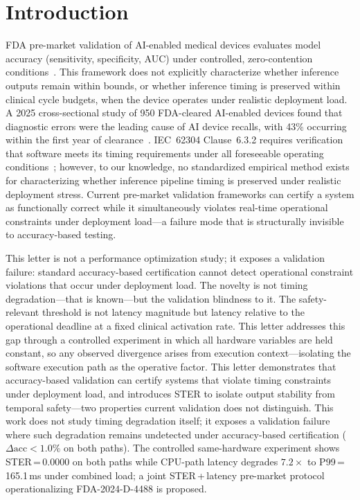 \documentclass[journal,10pt,twocolumn]{IEEEtran}
\begin{document}
\section{Introduction}

FDA pre-market validation of AI-enabled medical devices evaluates model
accuracy (sensitivity, specificity, AUC) under controlled,
zero-contention conditions~\cite{fda_draft_guidance}.
This framework does not explicitly characterize whether inference outputs
remain within bounds, or whether inference timing is preserved within
clinical cycle budgets, when the device operates under realistic
deployment load.
A 2025 cross-sectional study of 950 FDA-cleared AI-enabled devices found
that diagnostic errors were the leading cause of AI device recalls, with
43\% occurring within the first year of clearance~\cite{lee2025recalls}.
IEC~62304 Clause~6.3.2 requires verification that software meets its
timing requirements under all foreseeable operating conditions~\cite{iec62304};
however, to our knowledge, no standardized empirical method exists for characterizing
whether inference pipeline timing is preserved under realistic deployment
stress.
Current pre-market validation frameworks can certify a system as
functionally correct while it simultaneously violates real-time
operational constraints under deployment load---a failure mode that is
structurally invisible to accuracy-based testing.

This letter is not a performance optimization study; it exposes a
validation failure: standard accuracy-based certification cannot detect
operational constraint violations that occur under deployment load.
The novelty is not timing degradation---that is known---but the
validation blindness to it.
The safety-relevant threshold is not latency magnitude but latency
relative to the operational deadline at a fixed clinical activation rate.
This letter addresses this gap through a controlled experiment in which
all hardware variables are held constant, so any observed divergence
arises from execution context---isolating the software execution path
as the operative factor.
This letter demonstrates that accuracy-based validation can certify
systems that violate timing constraints under deployment load, and
introduces STER to isolate output stability from temporal safety---two
properties current validation does not distinguish.
This work does not study timing degradation itself; it exposes a
validation failure where such degradation remains undetected under
accuracy-based certification ($\Delta\mathrm{acc}{<}1.0\%$ on both paths).
The controlled same-hardware experiment shows STER\,=\,0.0000 on both
paths while CPU-path latency degrades $7.2{\times}$ to
P99\,=\,165.1\,ms under combined load; a joint STER\,+\,latency
pre-market protocol operationalizing FDA-2024-D-4488 is proposed.
\end{document}
